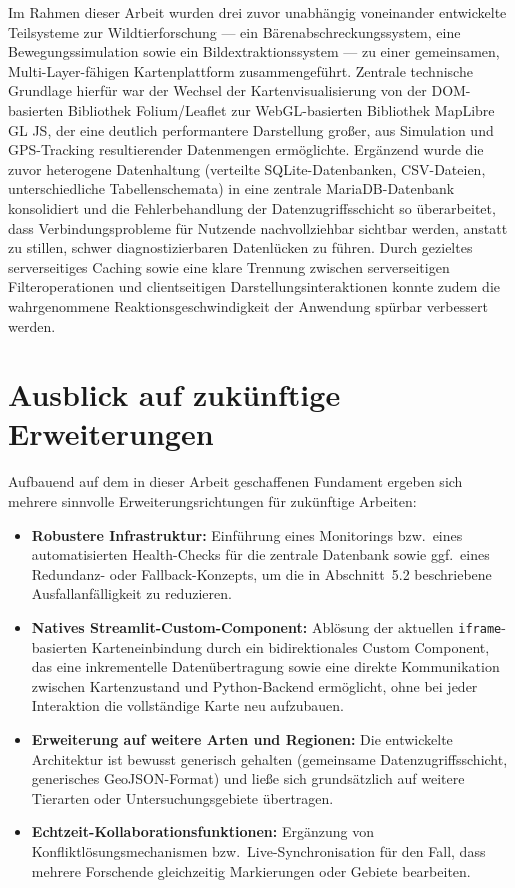 \documentclass[12pt,a4paper]{report}
\begin{document}
Im Rahmen dieser Arbeit wurden drei zuvor unabhängig voneinander entwickelte Teilsysteme zur Wildtierforschung — ein Bärenabschreckungssystem, eine Bewegungssimulation sowie ein Bildextraktionssystem — zu einer gemeinsamen, Multi-Layer-fähigen Kartenplattform zusammengeführt. Zentrale technische Grundlage hierfür war der Wechsel der Kartenvisualisierung von der DOM-basierten Bibliothek Folium/Leaflet zur WebGL-basierten Bibliothek MapLibre GL JS, der eine deutlich performantere Darstellung großer, aus Simulation und GPS-Tracking resultierender Datenmengen ermöglichte. Ergänzend wurde die zuvor heterogene Datenhaltung (verteilte SQLite-Datenbanken, CSV-Dateien, unterschiedliche Tabellenschemata) in eine zentrale MariaDB-Datenbank konsolidiert und die Fehlerbehandlung der Datenzugriffsschicht so überarbeitet, dass Verbindungsprobleme für Nutzende nachvollziehbar sichtbar werden, anstatt zu stillen, schwer diagnostizierbaren Datenlücken zu führen. Durch gezieltes serverseitiges Caching sowie eine klare Trennung zwischen serverseitigen Filteroperationen und clientseitigen Darstellungsinteraktionen konnte zudem die wahrgenommene Reaktionsgeschwindigkeit der Anwendung spürbar verbessert werden.

\section{Ausblick auf zukünftige Erweiterungen}

Aufbauend auf dem in dieser Arbeit geschaffenen Fundament ergeben sich mehrere sinnvolle Erweiterungsrichtungen für zukünftige Arbeiten:

\begin{itemize}
    \item \textbf{Robustere Infrastruktur:} Einführung eines Monitorings bzw.\ eines automatisierten Health-Checks für die zentrale Datenbank sowie ggf.\ eines Redundanz- oder Fallback-Konzepts, um die in Abschnitt~5.2 beschriebene Ausfallanfälligkeit zu reduzieren.
    \item \textbf{Natives Streamlit-Custom-Component:} Ablösung der aktuellen \texttt{iframe}-basierten Karteneinbindung durch ein bidirektionales Custom Component, das eine inkrementelle Datenübertragung sowie eine direkte Kommunikation zwischen Kartenzustand und Python-Backend ermöglicht, ohne bei jeder Interaktion die vollständige Karte neu aufzubauen.
    \item \textbf{Erweiterung auf weitere Arten und Regionen:} Die entwickelte Architektur ist bewusst generisch gehalten (gemeinsame Datenzugriffsschicht, generisches GeoJSON-Format) und ließe sich grundsätzlich auf weitere Tierarten oder Untersuchungsgebiete übertragen.
    \item \textbf{Echtzeit-Kollaborationsfunktionen:} Ergänzung von Konfliktlösungsmechanismen bzw.\ Live-Synchronisation für den Fall, dass mehrere Forschende gleichzeitig Markierungen oder Gebiete bearbeiten.
\end{itemize}
\end{document}
